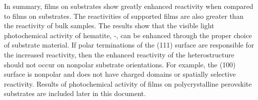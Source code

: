 In summary,  films on  substrates show greatly enhanced reactivity
when compared to films on  substrates. The reactivities of  supported
films are also greater than the reactivity of bulk  samples.  The results show
that the visible light photochemical activity of hematite, \textalpha-, can be
enhanced through the proper choice of substrate material. If polar terminations of the
(111) surface are responsible for the increased reactivity, then the enhanced
reactivity of the heterostructure should not occur on nonpolar substrate orientations. 
For example, the (100) surface is nonpolar and does not have charged domains or
spatially selective reactivity.\cite{Giocondi:2003wc} Results of photochemical activity of
 films on polycrystalline perovskite substrates are included later in this
document.